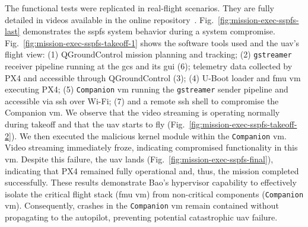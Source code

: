 The functional tests were replicated in real-flight scenarios. They are fully
detailed in videos available in the online repository~\cite{thesis-sw-github}.
Fig.~\ref{fig:mission-exec-sspfs-last} demonstrates the \gls{sspfs} system behavior
during a system compromise. Fig.~\ref{fig:mission-exec-sspfs-takeoff-1} shows
the software tools used and the \gls{uav}'s flight view: (1) QGroundControl
mission planning and tracking; (2) \lstinline{gstreamer} receiver pipeline
running at the \gls{gcs} and its \gls{gui} (6); telemetry data collected by PX4
and accessible through QGroundControl (3); (4) U-Boot loader and
\gls{fmu} \gls{vm} executing PX4; (5) \lstinline{Companion}
\gls{vm} running the \lstinline{gstreamer} sender pipeline and accessible via
\gls{ssh} over Wi-Fi; (7) and a remote \gls{ssh} shell to compromise the Companion
\gls{vm}. We observe that the video streaming is operating normally during
takeoff and that the \gls{uav} starts to fly (Fig.~\ref{fig:mission-exec-sspfs-takeoff-2}).
We then executed the malicious kernel module within the \lstinline{Companion}
\gls{vm}. Video streaming immediately froze, indicating compromised
functionality in this \gls{vm}. Despite this failure, the \gls{uav} lands (Fig.~\ref{fig:mission-exec-sspfs-final}),
indicating that PX4 remained fully operational and, thus, the mission completed successfully.
%
These results demonstrate Bao's hypervisor capability to effectively isolate the
critical flight stack (\gls{fmu} \gls{vm}) from non-critical components
(\lstinline{Companion} \gls{vm}).
Consequently, crashes in the \lstinline{Companion} \gls{vm} remain contained without propagating to the autopilot, preventing potential catastrophic \gls{uav} failure.

